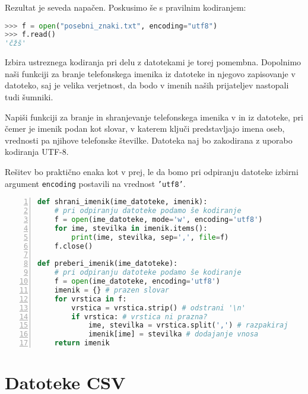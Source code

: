 Rezultat je seveda napačen. Poskusimo še s pravilnim kodiranjem:
\begin{lstlisting}[language=Python, showstringspaces=false]
>>> f = open("posebni_znaki.txt", encoding="utf8")
>>> f.read()
'čžš'
\end{lstlisting}

Izbira ustreznega kodiranja pri delu z datotekami je torej pomembna. Dopolnimo naši funkciji za branje telefonskega imenika iz datoteke in njegovo zapisovanje v datoteko, saj je velika verjetnost, da bodo v imenih naših prijateljev nastopali tudi šumniki.

\begin{zgled}
Napiši funkciji za branje in shranjevanje telefonskega imenika v in iz datoteke, pri čemer je imenik podan kot slovar, v katerem ključi predstavljajo imena oseb, vrednosti pa njihove telefonske številke. Datoteka naj bo zakodirana z uporabo kodiranja UTF-8.
\end{zgled}
\begin{resitev}
Rešitev bo praktično enaka kot v prej, le da bomo pri odpiranju datoteke izbirni argument \texttt{encoding} postavili na vrednost \texttt{'utf8'}.
\begin{lstlisting}[language=Python, showstringspaces=false,numbers=left]
def shrani_imenik(ime_datoteke, imenik):
    # pri odpiranju datoteke podamo še kodiranje
    f = open(ime_datoteke, mode='w', encoding='utf8')
    for ime, stevilka in imenik.items():
        print(ime, stevilka, sep=',', file=f)
    f.close()

def preberi_imenik(ime_datoteke):
    # pri odpiranju datoteke podamo še kodiranje
    f = open(ime_datoteke, encoding='utf8') 
    imenik = {} # prazen slovar
    for vrstica in f:
        vrstica = vrstica.strip() # odstrani '\n'
        if vrstica: # vrstica ni prazna?
            ime, stevilka = vrstica.split(',') # razpakiraj
            imenik[ime] = stevilka # dodajanje vnosa
    return imenik
\end{lstlisting}
\end{resitev}

\section{Datoteke CSV}

